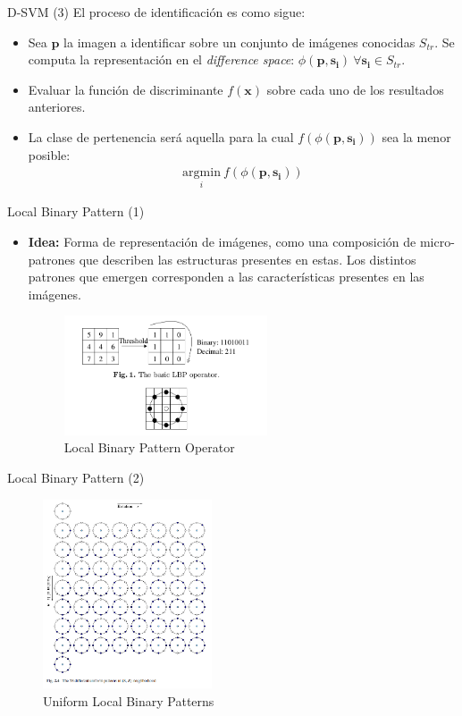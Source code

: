 \documentclass{beamer}
\begin{document}
\begin{frame}{D-SVM (3)}
    El proceso de identificación es como sigue:
\begin{itemize}
    \item Sea $\mathbf{p}$ la imagen a identificar sobre un conjunto de imágenes conocidas $S_{tr}$. Se computa la
    representación en el \textit{difference space}: $\phi(\mathbf{p},\mathbf{s_i}) \ \forall \mathbf{s_i} \in S_{tr}$.
    \item Evaluar la función de discriminante $f(\mathbf{x})$ sobre cada uno de los resultados anteriores.
    \item La clase de pertenencia será aquella para la cual $f(\phi(\mathbf{p},\mathbf{s_i}))$ sea la menor posible:
    \begin{align}
        \underset{i} {\mathrm{argmin}} ~f(\phi(\mathbf{p},\mathbf{s_i}))
    \end{align}
\end{itemize}
    
\end{frame}

\begin{frame}{Local Binary Pattern (1)}
\begin{itemize}
    \item \textbf{Idea:} Forma de representación de imágenes, como una composición de micro-patrones que describen
    las estructuras presentes en estas. Los distintos patrones que emergen corresponden a las características presentes
    en las imágenes.
\begin{figure}[htpb!]
\centering
\includegraphics[width=6cm]{lbp}
\caption{Local Binary Pattern Operator}
\end{figure}
\end{itemize}
\end{frame}

\begin{frame}{Local Binary Pattern (2)}
\begin{figure}[htpb!]
\centering
\includegraphics[width=5cm]{uniform_lbp}
\caption{Uniform Local Binary Patterns}
\end{figure}
\end{frame}
\end{document}
